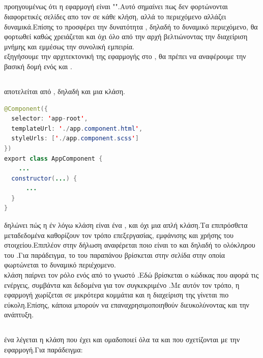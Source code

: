 \subsection{}
 προηγουμένως ότι η εφαρμογή είναι "".Αυτό σημαίνει πως δεν φορτώνονται διαφορετικές σελίδες απο τον  σε κάθε κλήση, αλλά το περιεχόμενο αλλάζει δυναμικά.Επίσης το  προσφέρει την δυνατότητα , δηλαδή το δυναμικό περιεχόμενο, θα φορτωθεί καθώς χρειάζεται και όχι όλο από την αρχή βελτιώνοντας την διαχείριση μνήμης και εμμέσως την συνολική εμπειρία.\\
 εξηγήσουμε την αρχιτεκτονική της εφαρμογής στο , θα πρέπει να αναφέρουμε την βασική δομή ενός  και .\\
\subsection*{}
  αποτελείται από , δηλαδή  και μια κλάση.
	\begin{lstlisting}[language=Java]
@Component({
  selector: 'app-root',
  templateUrl: './app.component.html',
  styleUrls: ['./app.component.scss']
})
export class AppComponent {
	...
  constructor(...) {
      ...
  }
}
	\end{lstlisting}
  δηλώνει πώς η έν λόγω κλάση είναι ένα , και όχι μια απλή κλάση.Τα επιπρόσθετα μεταδεδομένα καθορίζουν τον τρόπο επεξεργασίας, εμφάνισης και χρήσης του στοιχείου.Επιπλέον στην δήλωση αναφέρεται ποιο είναι το  και  δηλαδή το  ολόκληρου του .Για παράδειγμα, το  του παραπάνου βρίσκεται στην σελίδα στην οποία φωρτώνεται το δυναμικό περιέχομενο.\\
 κλάση παίρνει τον ρόλο ενός  από το γνωστό .Εδώ βρίσκεται ο κώδικας που αφορά τις ενέργεις, συμβάντα και δεδομένα για τον συγκεκριμένο .Με αυτόν τον τρόπο, η εφαρμογή χωρίζεται σε μικρότερα κομμάτια και η διαχείριση της γίνεται πιο εύκολη.Επίσης, κάποια  μπορούν να επαναχρησιμοποιηθούν διευκολύνοντας και την ανάπτυξη.

\subsection*{}
  ένα  λέγεται η κλάση που έχει  και ομαδοποιεί όλα τα  και  που σχετίζονται με την εφαρμογή.Για παράδειγμα:\\

